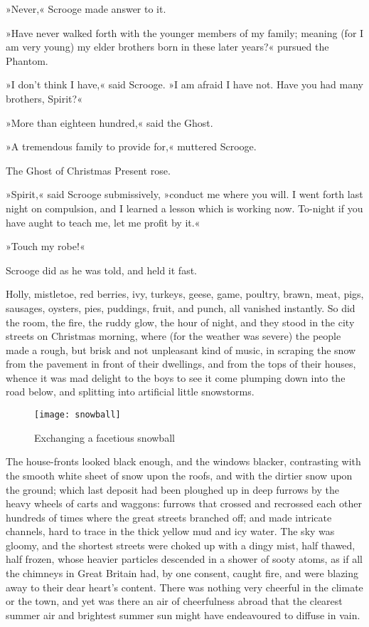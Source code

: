 »Never,« Scrooge made answer to it.

»Have never walked forth with the younger members of my family; meaning (for I am very young) my elder brothers born in these later years?« pursued the Phantom.

»I don't think I have,« said Scrooge. »I am afraid I have not. Have you had many brothers, Spirit?«

»More than eighteen hundred,« said the Ghost.

»A tremendous family to provide for,« muttered Scrooge.

The Ghost of Christmas Present rose.

»Spirit,« said Scrooge submissively, »conduct me where you will. I went forth last night on compulsion, and I learned a lesson which is working now. To-night if you have aught to teach me, let me profit by it.«

»Touch my robe!«

Scrooge did as he was told, and held it fast.

Holly, mistletoe, red berries, ivy, turkeys, geese, game, poultry, brawn, meat, pigs, sausages, oysters, pies, puddings, fruit, and  punch, all vanished instantly. So did the room, the fire, the ruddy glow, the hour of night, and they stood in the city streets on Christmas morning, where (for the weather was severe) the people made a rough, but brisk and not unpleasant kind of music, in scraping the snow from the pavement in front of their dwellings, and from the tops of their houses, whence it was mad delight to the boys to see it come plumping down into the road below, and splitting into artificial little snowstorms.

\begin{figure}[tbh!]
\centering
\texttt{[image: snowball]}
\caption{Exchanging a facetious snowball}
\end{figure}

The house-fronts looked black enough, and the windows black\-er, contrasting with the smooth white sheet of snow upon the roofs, and with the dirtier snow upon the ground; which last deposit had been ploughed up in deep furrows by the heavy wheels of carts and waggons: furrows that crossed and recrossed each other hundreds of times where the great streets branched off; and made intricate channels, hard to trace in the thick yellow mud and icy water. The sky was gloomy, and the shortest streets were choked up with a dingy mist, half thawed, half frozen, whose heavier particles descended in a shower of sooty atoms, as if all the chimneys in Great Britain had, by one consent, caught fire, and were blazing away to their dear heart's content. There was nothing very cheerful in the climate or the town, and yet was there an air of cheerfulness abroad that the clearest summer air and brightest summer sun might have endeavoured to diffuse in vain.

